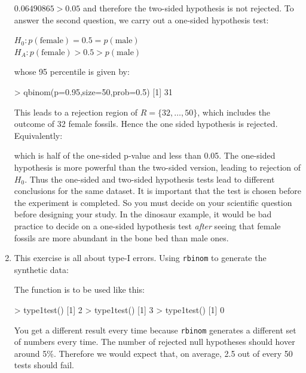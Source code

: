 \begin{enumerate}
$0.06490865>0.05$ and therefore the two-sided hypothesis is not
rejected. To answer the second question, we carry out a one-sided
hypothesis test:

  $H_0: p(\mbox{female}) = 0.5 = p(\mbox{male})$\\
  $H_{\!A}: p(\mbox{female}) > 0.5 > p(\mbox{male})$

\noindent whose 95 percentile is given by:

\begin{console}
> qbinom(p=0.95,size=50,prob=0.5)
[1] 31
\end{console}

This leads to a rejection region of $R=\{32,\ldots,50\}$, which
includes the outcome of 32 female fossils. Hence the one sided
hypothesis is rejected. Equivalently:


\noindent which is half of the one-sided p-value and less than
0.05. The one-sided hypothesis is more powerful than the two-sided
version, leading to rejection of $H_0$. Thus the one-sided and
two-sided hypothesis tests lead to different conclusions for the same
dataset. It is important that the test is chosen before the experiment
is completed. So you must decide on your scientific question before
designing your study. In the dinosaur example, it would be bad
practice to decide on a one-sided hypothesis test \emph{after} seeing
that female fossils are more abundant in the bone bed than male ones.

\item This exercise is all about type-I errors. Using \texttt{rbinom}
  to generate the synthetic data:


The function is to be used like this:

\begin{console}
> type1test()
[1] 2
> type1test()
[1] 3
> type1test()
[1] 0
\end{console}

You get a different result every time because \texttt{rbinom}
generates a different set of numbers every time. The number of
rejected null hypotheses should hover around 5\%.  Therefore we would
expect that, on average, 2.5 out of every 50 tests should fail.


\end{enumerate}
